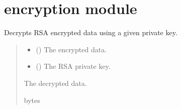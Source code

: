 \documentclass[letterpaper,10pt,english]{sphinxmanual}
\begin{document}

\begin{fulllineitems}
\label{\detokenize{doorknocking:doorknocking.main}}
\pysigstartsignatures
{}
\pysigstopsignatures
\end{fulllineitems}


\sphinxstepscope


\section{encryption module}
\label{\detokenize{encryption:module-encryption}}\label{\detokenize{encryption:encryption-module}}\label{\detokenize{encryption::doc}}

\begin{fulllineitems}
\label{\detokenize{encryption:encryption.decrypt_rsa}}
\pysigstartsignatures
{}
\pysigstopsignatures
\sphinxAtStartPar
Decrypts RSA encrypted data using a given private key.
\begin{quote}\begin{description}
\begin{itemize}
\item {} 
\sphinxAtStartPar
{} () \textendash{} The encrypted data.

\item {} 
\sphinxAtStartPar
{} () \textendash{} The RSA private key.

\end{itemize}

\sphinxAtStartPar
The decrypted data.

\sphinxAtStartPar
bytes

\end{description}\end{quote}

\end{fulllineitems}
\end{document}
